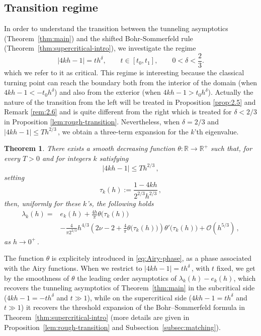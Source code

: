\documentclass[11pt]{amsart}
\numberwithin{equation}{section}
\newtheorem{theorem}{Theorem}[section]
\theoremstyle{remark}
\begin{document}
\subsection{Transition regime}
In order to understand the transition between the tunneling asymptotics (Theorem~\ref{thm:main})  and the shifted Bohr-Sommerfeld rule (Theorem~\ref{thm:supercritical-intro}), we investigate the regime
\[
	|4kh-1|=t h^\delta,
	\qquad
	t\in[t_0,t_1],
	\qquad
	0<\delta<\frac23.
\]
which we refer to it as critical.  This regime is interesting because the classical turning point
can reach the boundary both from the interior of the domain (when $4kh-1<-t_0h^\delta$) and also from  the exterior (when $4kh-1>  t_0 h^\delta$). Actually the nature of the transition from the left 
will be treated in Proposition \ref{prop:2.5} and Remark \ref{rem:2.6} and  is quite different from the right which is treated for $\delta < 2/3$ in Proposition \ref{lem:rough-transition}.
Nevertheless, when
 $\delta=2/3$ and $|4kh-1|\leq T h^{2/3}\,$, we obtain a
three-term expansion for the $k$'th eigenvalue.
%
\begin{theorem}\label{thm:transition-intro}
There exists a smooth decreasing function $\theta:\mathbb R\to\mathbb R^+$ such that, 	for every $T>0$ and for integers $k$ satisfying
	\begin{equation}\label{eq:transition-window-intro}
		|4kh-1|\leq T h^{2/3}\,,
	\end{equation}
	setting
	\begin{equation}\label{eq:tau-k-intro}
		\tau_k(h)
		:=
		\frac{1-4kh}{2^{2/3}h^{2/3}}\,,
	\end{equation}
	then, uniformly for these $k$'s, the following holds
	\begin{equation}\label{eq:transition-expansion-intro}
		\begin{split}
			\lambda_k(h)
			={}&e_k(h)
			+\frac{4h}{\pi}\theta\bigl(\tau_k(h)\bigr)\\
			&-\frac{4}{\pi 2^{2/3}}h^{4/3}
			\left(
			2\nu-2+\frac{4}{\pi}\theta\bigl(\tau_k(h)\bigr)
			\right)
			\theta'\bigl(\tau_k(h)\bigr)
			+\mathcal O(h^{5/3})\,,
		\end{split}
	\end{equation}
	as $h\to0^+\,$. 
\end{theorem}


The function $\theta$ is explicitely introduced in  \eqref{eq:Airy-phase}, as a phase associated with the Airy functions.
When we restrict to $|4kh-1|= th^{\delta}\,$, with $t$ fixed, we get by the smoothness of $\theta$ the leading order asymptotics of $\lambda_k(h)-e_k(h)$, which recovers the tunneling asymptotics of Theorem~\ref{thm:main} in the subcritical side ($4kh-1=-th^\delta$ and $t\gg 1$), while on the supercritical side ($4kh-1=th^\delta$ and $t\gg 1$) it recovers the threshold expansion of the Bohr--Sommerfeld formula in Theorem~\ref{thm:supercritical-intro} (more details are given in Proposition~\ref{lem:rough-transition} and Subsection~\ref{subsec:matching}). 
\end{document}
